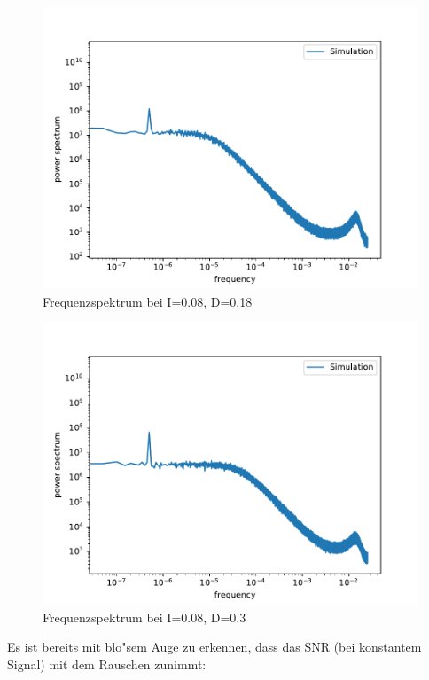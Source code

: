 \documentclass[12pt,a4paper]{article}
\begin{document}
\begin{figure}[H]
	\centering
	\includegraphics[scale=0.9]{inapikrealdrange6a8.pdf}
	\caption{Frequenzspektrum bei I=0.08, D=0.18}
	\label{deltaspectrum2}
\end{figure}
\begin{figure}[H]
	\centering
	\includegraphics[scale=0.9]{inapikrealdrange6a20.pdf}
	\caption{Frequenzspektrum bei I=0.08, D=0.3}
	\label{deltaspectrum3}
\end{figure}
Es ist bereits mit blo"sem Auge zu erkennen, dass das SNR (bei konstantem Signal) mit dem Rauschen zunimmt:
\end{document}
